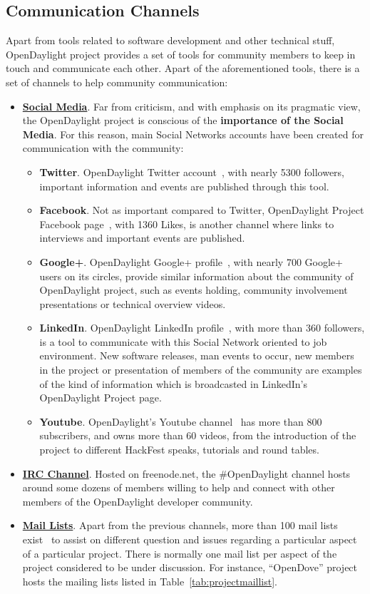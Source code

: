 \documentclass[a4paper, 12pt]{book}
\begin{document}
\subsection{Communication Channels}
Apart from tools related to software development and other technical stuff, OpenDaylight project provides a set of tools for community members to keep in touch and communicate each other. Apart of the aforementioned tools, there is a set of channels to help community communication:
\begin{itemize}\itemsep0pt
\item{\textbf{\underline{Social Media}}}. Far from criticism, and with emphasis on its pragmatic view, the OpenDaylight project is conscious of the \textbf{importance of the Social Media}. For this reason, main Social Networks accounts have been created for communication with the community:
\begin{itemize}\itemsep0pt
\item{\textbf{Twitter}}. OpenDaylight Twitter account~\cite{OpenDaylightTwitter}, with nearly 5300 followers, important information and events are published through this tool.
\item{\textbf{Facebook}}. Not as important compared to Twitter, OpenDaylight Project Facebook page~\cite{OpenDaylightFacebook}, with 1360 Likes, is another channel where links to interviews and important events are published.
\item{\textbf{Google+}}. OpenDaylight Google+ profile~\cite{OpenDaylightGooglePlus}, with nearly 700 Google+ users on its circles, provide similar information about the community of OpenDaylight project, such as events holding, community involvement presentations or technical overview videos.
\item{\textbf{LinkedIn}}. OpenDaylight LinkedIn profile~\cite{OpenDaylightLinkedIn}, with more than 360 followers, is a tool to communicate with this Social Network oriented to job environment. New software releases, man events to occur, new members in the project or presentation of members of the community are examples of the kind of information which is broadcasted in LinkedIn's OpenDaylight Project page.
\item{\textbf{Youtube}}. OpenDaylight's Youtube channel~\cite{OpenDaylightYoutube} has more than 800 subscribers, and owns more than 60 videos, from the introduction of the project to different HackFest speaks, tutorials and round tables.
\end{itemize}
\item{\textbf{\underline{IRC Channel}}}. Hosted on freenode.net, the \#OpenDaylight channel hosts around some dozens of members willing to help and connect with other members of the OpenDaylight developer community.
\item{\textbf{\underline{Mail Lists}}}. Apart from the previous channels, more than 100 mail lists exist~\cite{OpenDaylightMailLists} to assist on different question and issues regarding a particular aspect of a particular project. There is normally one mail list per aspect of the project considered to be under discussion. For instance, ``OpenDove'' project hosts the mailing lists listed in Table~\ref{tab:projectmaillist}.


\end{itemize}
\end{document}
